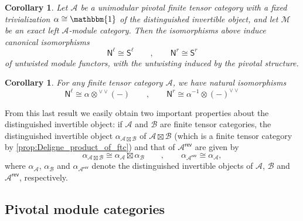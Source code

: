 \documentclass[11pt]{article}
\newcommand{\N}{\mathbb{N}}
\newcommand{\cA}{\mathcal{A}}
\newtheorem{corollary}[theorem]{Corollary}
\theoremstyle{definition}
\begin{document}
\begin{corollary}\label{corfss}
Let $\mathcal{A}$ be  a unimodular pivotal finite tensor category with a fixed trivialization
	$\alpha \cong \mathbbm{1}$ of the distinguished invertible object, and let $\mathcal{M}$ be an exact left $\mathcal{A}$-module category. Then the isomorphisms above induce canonical isomorphisms
	$$ \mathsf{N}^\ell \cong  \mathsf{S}^\ell \qquad , \qquad  \mathsf{N}^r \cong  \mathsf{S}^r $$
of untwisted module functors, with the untwisting induced by the pivotal structure.
 \end{corollary}
 
 




\begin{corollary}\label{cor:N=alpha_vee_vee}
For any   finite tensor category $\mathcal{A}$,  we have natural isomorphisms $$ \mathsf{N}^\ell \cong \alpha \otimes  {}^{\vee \vee} (-) \qquad , \qquad  \mathsf{N}^r \cong \alpha^{-1} \otimes  (-)^{\vee \vee} $$
\end{corollary}



From this last result we easily obtain two important properties about the distinguished invertible object: if $\mathcal{A}$ and $\mathcal{B}$ are finite tensor categories, the distinguished invertible object $\alpha_{\mathcal{A} \boxtimes \mathcal{B}}$ of $\mathcal{A} \boxtimes \mathcal{B}$ (which is a finite tensor category by \cref{prop:Deligne_product_of_ftc}) and that of $\mathcal{A}^\mathsf{rev}$ are given by 
\begin{equation}\label{eq:disting_inv_for_Deligne_product}
\alpha_{\mathcal{A} \boxtimes \mathcal{B}} \cong \alpha_\mathcal{A} \boxtimes \alpha_\mathcal{B} \qquad , \qquad \alpha_{\mathcal{A}^\mathsf{rev}} \cong \alpha_\mathcal{A},
\end{equation}
where $\alpha_\mathcal{A}$, $\alpha_\mathcal{B}$ and $\alpha_{\mathcal{A}^\mathsf{rev}}$ denote the distinguished invertible objects of $\mathcal{A}$, $\mathcal{B}$ and  $\mathcal{A}^\mathsf{rev}$, respectively.


\subsection{Pivotal module categories}
\end{document}
